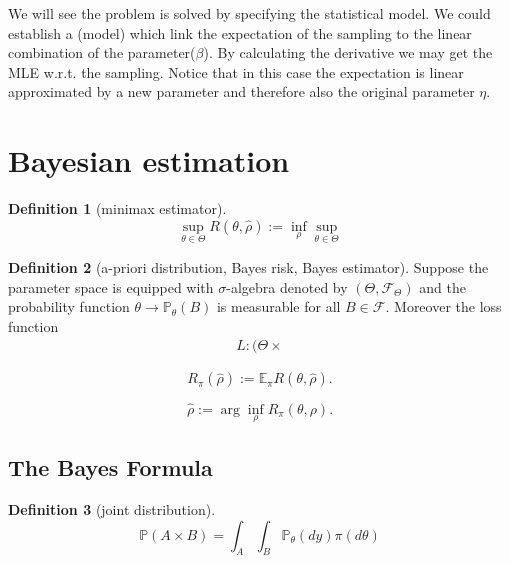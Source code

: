 \documentclass[a4paper,12pt, oneside, fleqn]{book}
\theoremstyle{definition}
\newtheorem{definition}{Definition}[section]
\theoremstyle{remark}
\begin{document}
We will see the problem is solved by specifying the statistical model. We could establish a (model) which link the expectation of the sampling to the linear combination of the parameter($\beta$). By calculating the derivative we may get the MLE w.r.t. the sampling. Notice that in this case the expectation is linear approximated by a new parameter and therefore also the original parameter $\eta$.



\section{Bayesian estimation}
\begin{definition}[minimax estimator]
\begin{equation}
	\sup_{\theta \in \Theta}	  R(\theta, \hat{\rho}):= \inf_{\rho} \sup_{\theta \in \Theta} 
\end{equation}
\end{definition}


\begin{definition}[a-priori distribution, Bayes risk, Bayes estimator]
	Suppose the parameter space is equipped with $\sigma$-algebra denoted by $(\Theta, \mathcal{F}_\Theta)$ and the probability function $\theta \rightarrow \mathbb{P}_\theta(B)$ is measurable for all $B \in \mathcal{F}$. Moreover the loss function
	\begin{align*}
		L: (\Theta \times 
	\end{align*}
	
	\begin{equation}
		R_\pi(\hat{\rho}):= \mathbb{E}_\pi R(\theta, \hat{\rho}). 
	\end{equation}
	
	\begin{equation}
		\hat{\rho} := \arg\inf_{\rho} R_\pi(\theta, \rho). 
	\end{equation}
\end{definition}

\subsection{The Bayes Formula}


\begin{definition}[joint distribution]
\begin{equation*}
	\mathbb{P}(A \times B) = \int_A \int_B \mathbb{P}_\theta(dy) \pi(d\theta)
\end{equation*}
\end{definition}
\end{document}
